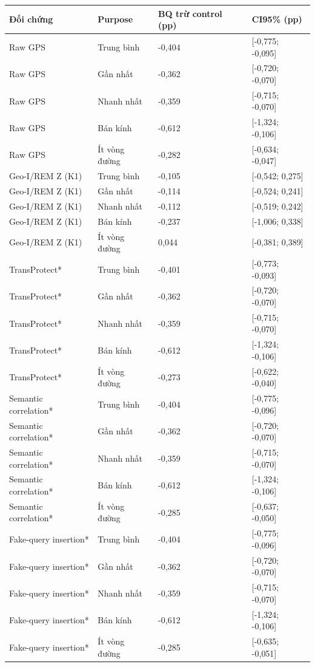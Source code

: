 \par\smallskip\noindent\begin{tabularx}{\linewidth}{@{}P{3.5cm}P{2.4cm}XX@{}}\toprule
\textbf{Đối chứng} & \textbf{Purpose} & \textbf{BQ trừ control (pp)} & \textbf{CI95\% (pp)} \\
\midrule
Raw GPS & Trung bình & -0{,}404 & [-0{,}775; -0{,}095] \\
Raw GPS & Gần nhất & -0{,}362 & [-0{,}720; -0{,}070] \\
Raw GPS & Nhanh nhất & -0{,}359 & [-0{,}715; -0{,}070] \\
Raw GPS & Bán kính & -0{,}612 & [-1{,}324; -0{,}106] \\
Raw GPS & Ít vòng đường & -0{,}282 & [-0{,}634; -0{,}047] \\
Geo-I/REM Z (K1) & Trung bình & -0{,}105 & [-0{,}542; 0{,}275] \\
Geo-I/REM Z (K1) & Gần nhất & -0{,}114 & [-0{,}524; 0{,}241] \\
Geo-I/REM Z (K1) & Nhanh nhất & -0{,}112 & [-0{,}519; 0{,}242] \\
Geo-I/REM Z (K1) & Bán kính & -0{,}237 & [-1{,}006; 0{,}338] \\
Geo-I/REM Z (K1) & Ít vòng đường & 0{,}044 & [-0{,}381; 0{,}389] \\
TransProtect* & Trung bình & -0{,}401 & [-0{,}773; -0{,}093] \\
TransProtect* & Gần nhất & -0{,}362 & [-0{,}720; -0{,}070] \\
TransProtect* & Nhanh nhất & -0{,}359 & [-0{,}715; -0{,}070] \\
TransProtect* & Bán kính & -0{,}612 & [-1{,}324; -0{,}106] \\
TransProtect* & Ít vòng đường & -0{,}273 & [-0{,}622; -0{,}040] \\
Semantic correlation* & Trung bình & -0{,}404 & [-0{,}775; -0{,}096] \\
Semantic correlation* & Gần nhất & -0{,}362 & [-0{,}720; -0{,}070] \\
Semantic correlation* & Nhanh nhất & -0{,}359 & [-0{,}715; -0{,}070] \\
Semantic correlation* & Bán kính & -0{,}612 & [-1{,}324; -0{,}106] \\
Semantic correlation* & Ít vòng đường & -0{,}285 & [-0{,}637; -0{,}050] \\
Fake-query insertion* & Trung bình & -0{,}404 & [-0{,}775; -0{,}096] \\
Fake-query insertion* & Gần nhất & -0{,}362 & [-0{,}720; -0{,}070] \\
Fake-query insertion* & Nhanh nhất & -0{,}359 & [-0{,}715; -0{,}070] \\
Fake-query insertion* & Bán kính & -0{,}612 & [-1{,}324; -0{,}106] \\
Fake-query insertion* & Ít vòng đường & -0{,}285 & [-0{,}635; -0{,}051] \\
\bottomrule\end{tabularx}\par\smallskip
